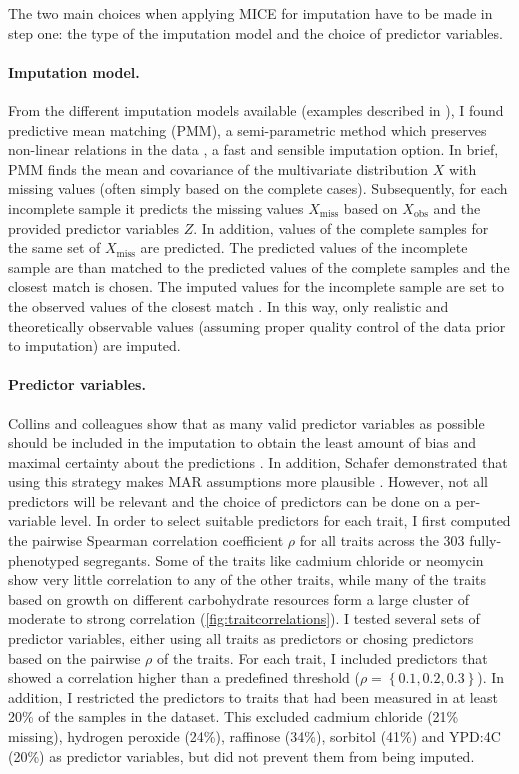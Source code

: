 The two main choices when applying MICE for imputation have to be made in step one: the type of the imputation model and the choice of predictor variables. 

\paragraph{Imputation model.}From the different imputation models available (examples described in \citep{vanBuuren2011}), I found predictive mean matching (PMM), a semi-parametric method which preserves non-linear relations in the data \citep{Little1988,vanBuuren2011}, a fast and sensible imputation option.  In brief, PMM finds the mean and covariance of the multivariate distribution \(X\) with missing values (often simply based on the complete cases). Subsequently, for each incomplete sample it predicts the missing values \(X_\text{miss}\) based on \(X_\text{obs}\) and the provided predictor variables \(Z\). In addition, values of the complete samples for the same set of \(X_\text{miss}\) are predicted. The predicted values of the incomplete sample are than matched to the predicted values of the complete samples and the closest match is chosen. The imputed values for the incomplete sample are set to the observed values of the closest match \citep{Little1988}. In this way, only realistic and theoretically observable values (assuming proper quality control of the data prior to imputation) are imputed.

\paragraph{Predictor variables.} Collins and colleagues show that as many valid predictor variables as possible should be included in the imputation to obtain the least amount of bias and maximal certainty about the predictions \citeyear{Collins2001}. In addition, Schafer demonstrated that using this strategy makes MAR assumptions more plausible \citep{Schafer1997}. However, not all predictors will be relevant and the choice of predictors can be done on a per-variable level. In order to select suitable predictors for each trait, I first computed the pairwise Spearman correlation coefficient \(\rho\) for all traits across the \num{303} fully-phenotyped segregants. Some of the traits like cadmium chloride or neomycin show very little correlation to any of the other traits, while many of the traits based on growth on different carbohydrate resources form a large cluster of moderate to strong correlation (\cref{fig:traitcorrelations}). 
I tested several sets of predictor variables, either using all traits as predictors or chosing predictors based on the pairwise \(\rho\) of the traits. For each trait, I included predictors that showed a correlation higher than a predefined threshold (\(\rho =\left\{0.1, 0.2, 0.3\right\}\)). In addition, I restricted the predictors to traits that had been measured in at least 20\% of the samples in the dataset. This excluded cadmium chloride  (21\% missing), hydrogen peroxide (24\%), raffinose (34\%), sorbitol (41\%) and YPD:4C (20\%) as predictor variables, but did not prevent them from being imputed.

